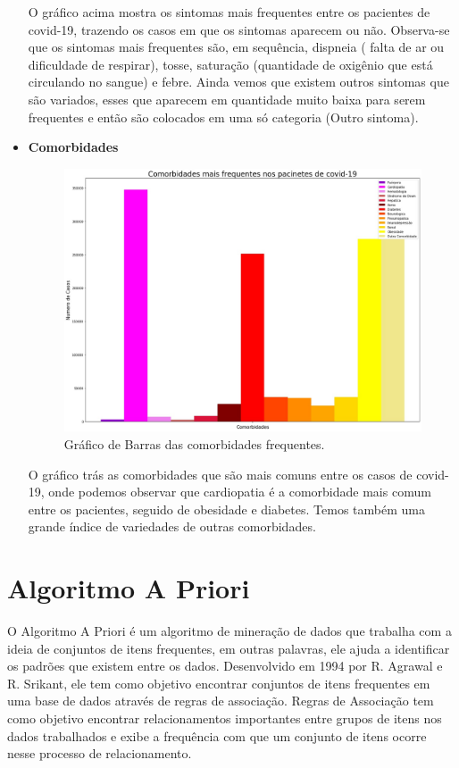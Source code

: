 \documentclass[tcc1]{uftex}
\begin{document}
\begin{itemize}
    O gráfico acima mostra os sintomas mais frequentes entre os pacientes de covid-19, trazendo os casos em que os sintomas aparecem ou não. Observa-se que os sintomas mais frequentes são, em sequência, dispneia ( falta de ar ou dificuldade de respirar), tosse, saturação (quantidade de oxigênio que está circulando no sangue) e febre. Ainda vemos que existem outros sintomas que são variados, esses que aparecem em quantidade muito baixa para serem frequentes e então são colocados em uma só categoria (Outro sintoma).
 
    \item\textbf{Comorbidades}
    \begin{figure}[h]
    \centering
    \includegraphics[width=11cm]{Comorbidade_solo.jpg} %
    \caption{Gráfico de Barras das comorbidades frequentes.}
    \end{figure}
    
    O gráfico trás as comorbidades que são mais comuns entre os casos de covid-19, onde podemos observar que cardiopatia é a comorbidade mais comum entre os pacientes, seguido de obesidade e diabetes. Temos também uma grande índice de variedades de outras comorbidades. 
    
 
 
 \end{itemize}


    
\chapter{Algoritmo A Priori}

O Algoritmo A Priori é um algoritmo de mineração de dados que trabalha com a ideia de conjuntos de itens frequentes, em outras palavras, ele ajuda a identificar os padrões que existem entre os dados. Desenvolvido em 1994 por R. Agrawal e R. Srikant, ele tem como objetivo encontrar conjuntos de itens frequentes em uma base de dados através de regras de associação. Regras de Associação tem como objetivo encontrar relacionamentos importantes entre grupos de itens nos dados trabalhados e exibe a frequência com que um conjunto de itens ocorre nesse processo de relacionamento.
\end{document}
